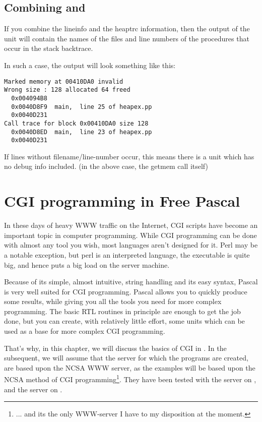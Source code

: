 \section{Combining  and }

If you combine the lineinfo and the heaptrc information, then the output
of the  unit will contain the names of the files and line
numbers of the procedures that occur in the stack backtrace.

In such a case, the output will look something like this:
\begin{verbatim}
Marked memory at 00410DA0 invalid
Wrong size : 128 allocated 64 freed
  0x004094B8
  0x0040D8F9  main,  line 25 of heapex.pp
  0x0040D231
Call trace for block 0x00410DA0 size 128
  0x0040D8ED  main,  line 23 of heapex.pp
  0x0040D231
\end{verbatim}
If lines without filename/line-number occur, this means there is a unit which
has no debug info included. (in the above case, the getmem call itself)


\chapter{CGI programming in Free Pascal}
\label{ch:CGIProgramming}

In these days of heavy WWW traffic on the Internet, CGI scripts have become
an important topic in computer programming. While CGI programming can be
done with almost any tool you wish, most languages aren't designed for it.
Perl may be a notable exception, but perl is an interpreted language, the
executable is quite big, and hence puts a big load on the server machine.

Because of its simple, almost intuitive, string handling and its easy syntax,
Pascal is very well suited for CGI programming. Pascal allows you to quickly
produce some results, while giving you all the tools you need for more
complex programming. The basic RTL routines in principle are enough to get
the job done, but you can create, with relatively little effort, some units
which can be used as a base for more complex CGI programming.

That's why, in this chapter, we will discuss the basics of CGI in \fpc.
In the subsequent, we will assume that the server for which the programs are
created, are based upon the NCSA  WWW server, as the examples
will be based upon the NCSA method of CGI programming\footnote{... and its
the only WWW-server I have to my disposition at the moment.}.
They have been tested with the  server on \linux, and
the  server on \windowsnt.

